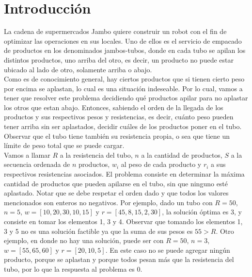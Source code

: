 \documentclass[10pt,a4paper]{article}
\begin{document}

\fecha{}


\maketitle
\thispagestyle{empty}

\newpage

\setcounter{page}{1}

\section{Introducción} \label{sec:introduccion}

La cadena de supermercados Jambo quiere construir un robot con el fin de optimizar las operaciones en sus locales. Uno de ellos es el servicio de empacado de productos en los denominados jambos-tubos, donde en cada tubo se apilan los distintos productos, uno arriba del otro, es decir, un producto no puede estar ubicado al lado de otro, solamente arriba o abajo.\\

Como es de conocimiento general, hay ciertos productos que si tienen cierto peso por encima se aplastan, lo cual es una situaci\'on indeseable. Por lo cual, vamos a tener que resolver este problema decidiendo qu\'e productos apilar para no aplastar los otros que estan abajo. Entonces, sabiendo el orden de la llegada de los productos y sus respectivos pesos y resistencias, es decir, cu\'anto peso pueden tener arriba sin ser aplastados, decidir cu\'ales de los productos poner en el tubo. Observar que el tubo tiene tambi\'en su resistencia propia, o sea que tiene un l\'imite de peso total que se puede cargar.\\

Vamos a llamar $R$ a la resistencia del tubo, $n$ a la cantidad de productos, $S$ a la secuencia ordenada de $n$ productos, $w_i$ al peso de cada producto y $r_i$ a sus respectivos resistencias asociados. El problema consiste en determinar la máxima cantidad de productos que pueden apilarse en el tubo, sin que ninguno esté aplastado. Notar que se debe respetar el orden dado y que todos los valores mencionados son enteros no negativos. Por ejemplo, dado un tubo con $R = 50$, $n = 5$, $w = [10, 20, 30, 10, 15]$ y $r = [45, 8, 15, 2, 30]$, la soluci\'on \'optima es 3, y consiste en tomar los elementos 1, 3 y 4. Observar que tomando los elementos 1, 3 y 5 no es una soluci\'on factible ya que la suma de sus pesos es $55 > R$. Otro ejemplo, en donde no hay una solución, puede ser con  $R = 50$, $n = 3$, $w = [55, 65, 60]$ y $r = [20, 10, 5]$. En este caso no se puede agregar ningún producto, porque se aplastan y porque todos pesan más que la resistencia del tubo, por lo que la respuesta al problema es $0$.     \\
\end{document}
